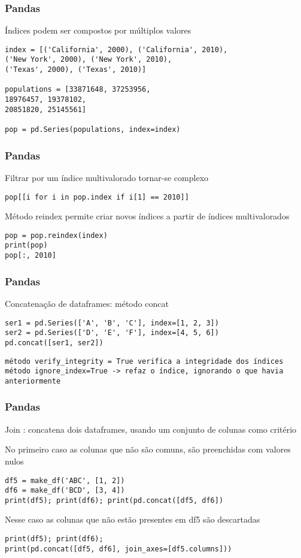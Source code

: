 \documentclass[aspectratio=169]{beamer} %
\begin{document}
\begin{frame}[fragile] \frametitle{Pandas}

Índices podem ser compostos por múltiplos valores

\begin{verbatim}
index = [('California', 2000), ('California', 2010),
('New York', 2000), ('New York', 2010),
('Texas', 2000), ('Texas', 2010)]

populations = [33871648, 37253956,
18976457, 19378102,
20851820, 25145561]

pop = pd.Series(populations, index=index)
\end{verbatim}

\end{frame}

\begin{frame}[fragile] \frametitle{Pandas}

Filtrar por um índice multivalorado tornar-se complexo
\begin{verbatim}
pop[[i for i in pop.index if i[1] == 2010]]
\end{verbatim}

Método reindex permite criar novos índices a partir de índices multivalorados

\begin{verbatim}
pop = pop.reindex(index)
print(pop)
pop[:, 2010]
\end{verbatim}

\end{frame}

\begin{frame}[fragile] \frametitle{Pandas}
Concatenação de dataframes: método concat
\begin{verbatim}
ser1 = pd.Series(['A', 'B', 'C'], index=[1, 2, 3])
ser2 = pd.Series(['D', 'E', 'F'], index=[4, 5, 6])
pd.concat([ser1, ser2])
\end{verbatim}

\begin{verbatim}
método verify_integrity = True verifica a integridade dos índices
método ignore_index=True -> refaz o índice, ignorando o que havia anteriormente
\end{verbatim}

\end{frame}

\begin{frame}[fragile] \frametitle{Pandas}
Join : concatena dois dataframes, usando um conjunto de colunas como critério

No primeiro caso as colunas que não são comuns, são preenchidas com valores nulos
\begin{verbatim}
df5 = make_df('ABC', [1, 2])
df6 = make_df('BCD', [3, 4])
print(df5); print(df6); print(pd.concat([df5, df6])
\end{verbatim}

Nesse caso as colunas que não estão presentes em df5 são descartadas
\begin{verbatim}
print(df5); print(df6);
print(pd.concat([df5, df6], join_axes=[df5.columns]))
\end{verbatim}


\end{frame}
\end{document}
